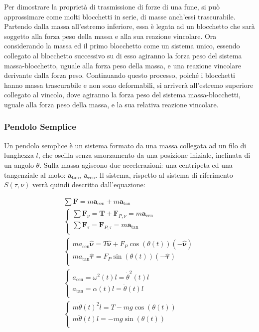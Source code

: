 \documentclass{article}
\newcommand{\vect}[1]{\boldsymbol{\mathbf{#1}}}
\numberwithin{equation}{subsection}
\begin{document}
Per dimostrare la proprietà di trasmissione di forze di una fune, si può approssimare 
come molti blocchetti in serie, di masse anch'essi trascurabile. 
Partendo dalla massa all'estremo inferiore, essa è legata ad un 
blocchetto che sarà soggetto alla forza peso della massa e alla 
sua reazione vincolare. Ora considerando la massa ed il primo 
blocchetto come un sistema unico, essendo collegato al blocchetto 
successivo su di esso agiranno la forza peso del sistema massa-blocchetto, uguale alla forza peso della massa, e una reazione 
vincolare derivante dalla forza peso. Continuando questo processo, 
poiché i blocchetti hanno massa trascurabile e non sono deformabili, 
si arriverà all'estremo superiore collegato al vincolo, dove agiranno 
la forza peso del sistema massa-blocchetti, uguale alla forza peso 
della massa, e la sua relativa reazione vincolare.

\subsubsection{Pendolo Semplice}
Un pendolo semplice è un sistema formato da una massa collegata 
ad un filo di lunghezza $l$, che oscilla senza smorzamento da una posizione iniziale, inclinata 
di un angolo $\theta$. Sulla massa agiscono due accelerazioni: 
una centripeta ed una tangenziale al moto: $\vect{a}_\mathrm{tan},\:\vect{a}_\mathrm{cen}$. 
Il sistema, rispetto al sistema di riferimento $S(\tau,\nu)$ 
verrà quindi descritto dall'equazione:

\begin{gather*}
    \sum\vect{F}=m\vect{a}_\mathrm{cen}+m\vect{a}_\mathrm{tan}\\
    \begin{cases}
        \sum\vect{F}_{\nu}=\vect{T}+\vect{F}_{P,\nu}=m\vect{a}_\mathrm{cen}\\
        \sum\vect{F}_{\tau}=\vect{F}_{P,\tau}=m\vect{a}_\mathrm{tan}\\
    \end{cases}\\
    \begin{cases}
        ma_\mathrm{cen}\hat{\vect{\nu}}=T\hat{\vect{\nu}}+F_P\cos(\theta(t))(-\hat{\vect{\nu}})\\
        ma_\mathrm{tan}\hat{\vect{\tau}}=F_P\sin(\theta(t))(-\hat{\vect{\tau}})\\
    \end{cases}\\
    \begin{cases}
        a_\mathrm{cen}=\omega^{2}(t)l=\dot\theta^{2}(t)l\\
        a_\mathrm{tan}=\alpha(t)l=\ddot\theta(t)l\\
    \end{cases}\\
    \begin{cases}
        m\dot\theta(t)^{2}l=T-mg\cos(\theta(t))\\
        m\ddot\theta(t)l=-mg\sin(\theta(t))\\
    \end{cases}
\end{gather*}
\end{document}
